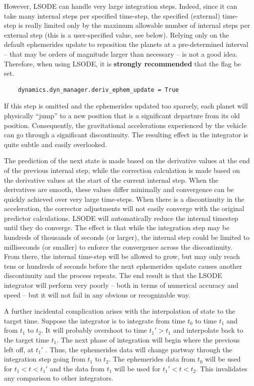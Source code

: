However, LSODE can handle very large integration steps.
Indeed, since it can take many internal steps per specified time-step, the
specified (external) time-step is really limited only by the maximum
allowable number of internal steps per external step (this is a
user-specified value, see below).  Relying only on the default ephemerides
update to reposition the planets at a pre-determined interval -- that may be
orders of magnitude larger than necessary -- is not a good idea.  Therefore,
when using LSODE, it is \textbf{strongly recommended} that the flag be set.

\begin{verbatim}
    dynamics.dyn_manager.deriv_ephem_update = True
\end{verbatim}

If this step is omitted and the ephemerides updated too sparsely, each planet
will physically “jump” to a new position that is a significant departure from
its old position.  Consequently, the gravitational accelerations experienced
by the vehicle can go through a significant discontinuity.  The resulting
effect in the integrator is quite subtle and easily overlooked.

The prediction of the next state is made based
on the derivative values at the end of the previous internal step, while
the correction calculation is made based on the derivative values at the
start of
the current internal step.  When the derivatives are smooth, these values
differ minimally and convergence can be quickly achieved over very large
time-steps.  When there is a discontinuity in the acceleration, the corrector
adjustments
will not easily converge with the original predictor calculations.  LSODE
will automatically reduce the internal timestep until they do converge.  The
effect is that while the integration step may be hundreds of thousands
of seconds (or larger), the internal step could be limited to
milliseconds (or smaller) to enforce the convergence across the discontinuity.
From there, the internal time-step will be allowed
to grow, but may only reach tens or hundreds of seconds before the next
ephemerides update causes another discontinuity
and the process repeats.  The end result is that the LSODE integrator
will perform very poorly -- both in terms of numerical accuracy and speed --
but it will not fail in any obvious or recognizable way.

A further incidental complication arises with the interpolation of state
to the target time.  Suppose the integrator is to integrate from time
$t_0$ to time $t_1$ and from $t_1$ to $t_2$.  It will probably overshoot to
time $t_1' > t_1$ and interpolate
back to the target time $t_1$.  The next phase of integration will begin
where the previous left off, at $t_1'$ . Thus, the ephemerides data will change
partway through the integration step going from $t_1$ to $t_2$.
The ephemerides data from $t_0$ will
be used for $t_1  < t <  t_1'$ and the data from $t_1$  will be used for
$t_1' < t < t_2$.  This invalidates any comparison to other integrators.

